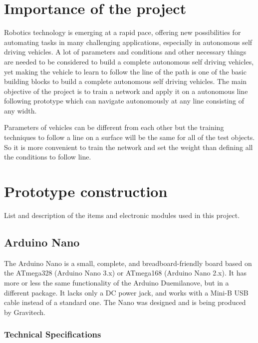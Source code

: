 \documentclass[14pt,a4paper]{extarticle}
\begin{document}
	\section{Importance of the project}
	
	Robotics technology is emerging at a rapid pace, offering new possibilities for automating tasks in many challenging applications, especially in autonomous self driving vehicles. A lot of parameters and conditions and other necessary things are needed to be considered to build a complete autonomous self driving vehicles, yet making the vehicle to learn to follow the line of the path is one of the basic building blocks to build a complete autonomous self driving vehicles. The main objective of the project is to train a network and apply it on a autonomous line following prototype which can navigate autonomously at any line consisting of any width. 
	
	Parameters of vehicles can be different from each other but the training techniques to follow a line on a surface will be the same for all of the test objects. So it is more convenient to train the network and set the weight than defining all the conditions to follow line.
	
	
	\section{Prototype construction}
	
	List and description of the items and electronic modules used in this project. 
	
	\subsection{Arduino Nano}
	
	The Arduino Nano is a small, complete, and breadboard-friendly board based on the ATmega328 (Arduino Nano 3.x) or ATmega168 (Arduino Nano 2.x). It has more or less the same functionality of the Arduino Duemilanove, but in a different package. It lacks only a DC power jack, and works with a Mini-B USB cable instead of a standard one. The Nano was designed and is being produced by Gravitech.
	

	\subsubsection{Technical Specifications}
	
\end{document}
